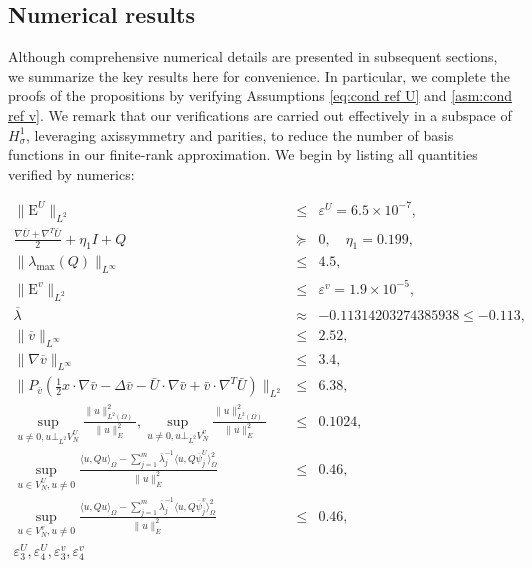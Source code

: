 \documentclass[11pt,a4paper]{article}
\numberwithin{equation}{section}
\newcommand{\Epsilon}{\mathrm{E}}
\newcommand{\cdummy}{\cdot}
\begin{document}
\subsection{Numerical results}\label{Sec:num prev}
Although comprehensive numerical details are presented in subsequent sections,
we summarize the key results here for convenience. In particular, we complete the proofs of the propositions by verifying Assumptions \ref{eq:cond ref U} and \ref{asm:cond ref
v}. We remark that our verifications are carried out effectively in a subspace of
$H^1_{\sigma}$, leveraging axissymmetry and parities, to reduce the number of
basis functions in our finite-rank approximation. We begin by listing all quantities verified by numerics:

\begin{eqnarray}
  \| \Epsilon^U \|_{L^2} & \leqslant & \varepsilon^U = 6.5 \times 10^{- 7},\\
  \frac{\nabla \bar{U} + \nabla^T  \bar{U}}{2} + \eta_1 I + Q & \succeq & 0,
  \quad \eta_1 = 0.199,\\
  \| \lambda_{\max} (Q)\|_{L^{\infty}} & \leqslant & 4.5,\\
  \| \Epsilon^v \|_{L^2} & \leqslant & \varepsilon^v = 1.9 \times 10^{- 5},\\
  \overline{\lambda} & \approx  & - 0.11314203274385938 \leqslant - 0.113,\\
  \| \overline{v} \|_{L^{\infty}} & \leqslant & 2.52,\\
  \| \nabla \overline{v} \|_{L^{\infty}} & \leqslant & 3.4,\\
  \|P_{\bar{v}} (\frac{1}{2} x \cdummy \nabla \bar{v} - \Delta \bar{v} -
  \bar{U} \cdot \nabla \bar{v} + \bar{v} \cdummy \nabla^T  \bar{U})\|_{L^2} &
  \leqslant & 6.38,\\
  \sup_{u \neq 0, u \bot_{L^2} V^U_N}  \frac{\|u\|^2_{L^2
  (\Omega)}}{\|u\|^2_E}, \sup_{u \neq 0, u \bot_{L^2} V^v_N} 
  \frac{\|u\|^2_{L^2 (\Omega)}}{\|u\|^2_E} & \leqslant & 0.1024,\\
  \sup_{u \in V_N^{U}, u \neq 0}  \frac{\langle u, Qu
   \rangle_{\Omega} - \sum_{j = 1}^m \overline{\lambda}_j^{- 1}  \langle u, Q
   \overline{\psi}_j^{ U} \rangle_{\Omega}^2}{\|u\|^2_E} & \leqslant & 0.46,\\
   \sup_{u \in V_N^{v}, u \neq 0}  \frac{\langle u, Qu
   \rangle_{\Omega} - \sum_{j = 1}^m \overline{\lambda}_j^{- 1}  \langle u, Q
   \overline{\psi}_j^{ v} \rangle_{\Omega}^2}{\|u\|^2_E} & \leqslant & 0.46,\\
  \varepsilon^U_3, \varepsilon^U_4, \varepsilon^v_3, \varepsilon^v_4 &

\end{eqnarray}
\end{document}
